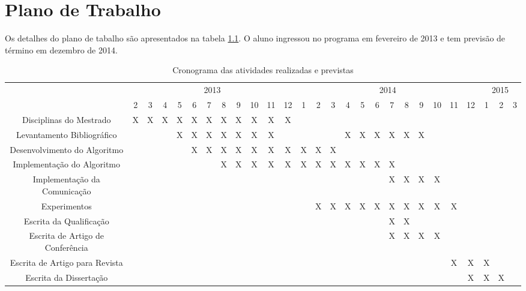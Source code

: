 \pagestyle{empty}
\cleardoublepage
\pagestyle{fancy}

\onehalfspacing

\chapter{Plano de Trabalho}\label{cap7}


Os detalhes do plano de tabalho são apresentados na tabela \ref{t_cronograma}. O aluno
ingressou no programa em fevereiro de 2013 e tem previsão de término em dezembro
de 2014.

\begin{table}[!htpb]
\centering

\begin{small}

\setlength{\tabcolsep}{2pt}

\begin{tabular}{|c|c|c|c|c|c|c|c|c|c|c|c|c|c|c|c|c|c|c|c|c|c|c|c|c|c|c|} \hline

 & \multicolumn{11}{c|}{2013}  & \multicolumn{12}{c|}{2014} & \multicolumn{3}{c|}{2015}  \\ \cline{2-27}
\raisebox{1.5ex}{Etapa} & 2 & 3 & 4  & 5 & 6 & 7 & 8 & 9 & 10 & 11 & 12 & 1 & 2 & 3 & 4 & 5 & 6 & 7 & 8 & 9 & 10 & 11 & 12 & 1 & 2 & 3\\ \hline

Disciplinas do Mestrado & X & X & X & X & X & X & X & X & X & X & X & & & & & & & & & & & & & & & \\ \hline
Levantamento Bibliográfico &  &  &  & X & X & X & X & X & X & X & & & & & X & X & X & X & X & X & & & & & &\\ \hline
Desenvolvimento do Algoritmo & & & & & X & X & X & X & X & X & X & X & X & X & & & & & & & & & & & &\\ \hline
Implementação do Algoritmo & & & & & & & X & X & X & X & X & X & X & X & X & X & X & X & & & & & & & &\\ \hline
Implementação da Comunicação & & & & & & &  &  & &  &  &  &  &  & &  &  & X & X & X & X & & & & &\\ \hline
Experimentos & & & & & & & & & & & & & X & X & X & X & X & X & X & X & X & X & & & &\\ \hline
Escrita da Qualificação & & &  & & & & & & & & & &  &  & & & & X & X & & & & & & &\\ \hline
Escrita de Artigo de Conferência & & & & & & & & & & & & & & & & & & X & X & X & X & & & & & \\ \hline
Escrita de Artigo para Revista & & & & & &  & & & & & & & & & & &  &  &  &  &  & X & X & X & & \\ \hline
Escrita da Dissertação & & & & & &  & & & & & & & & & & &  &  &  &  &  & & X & X & X & \\ \hline

\end{tabular}
\end{small}
\caption{Cronograma das atividades realizadas e previstas}
\label{t_cronograma}
\end{table}

